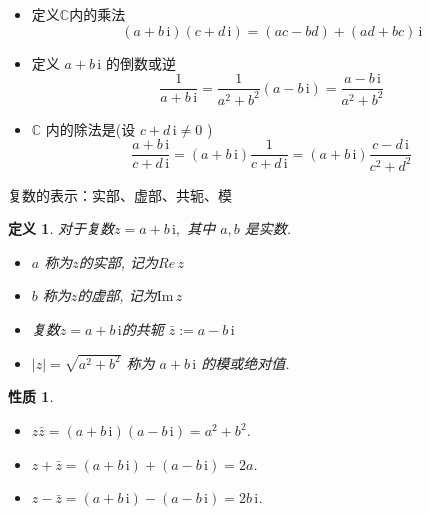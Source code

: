 \documentclass[11pt,punct]{ctexbeamer}
\newtheorem*{defi}{定义}
\newtheorem*{prop}{性质}
\def\i{\, \mathrm{i}}
\begin{document}
\begin{frame}
	\begin{itemize}
		\item 定义$\mathbb{C}$内的乘法
		\[
		(a+b \i)(c+d \i) =(a c-b d)+(a d+b c) \i
		\]

		\item 定义 $a+b {\i}$ 的倒数或逆
		\[
		\frac{1}{a+b \i}=\frac{1}{a^{2}+b^{2}}(a-b \i)=\frac{a-b \i}{a^{2}+b^{2}}
		\]
		\item  $\mathbb{C}$ 内的除法是(设 $c+d {\i} \neq 0$ )
		\[
		\frac{a+b \i}{c+d \i}=(a+b \i) \frac{1}{c+d \i}=(a+b \i) \frac{c-d \i}{c^{2}+d^{2}}
		\]
	\end{itemize}
\end{frame}

\begin{frame}{复数的表示：实部、虚部、共轭、模}

	\begin{defi}
		对于复数$z=a+b \i,$ 其中 $a, b$ 是实数.

		\begin{itemize}
			\item $a$ 称为$z$的\alert{实部}, 记为${Re}\,  z$

			\item $b$ 称为$z$的\alert{虚部}, 记为$\text{Im}\,  z$

			\item 复数$z=a+b \i$的\alert{共轭} $\bar{z}:=a-b\i$
			\item  $|z|=\sqrt{a^{2}+b^{2}}$ 称为 $a+b \i$ 的\alert{模}或绝对值.
		\end{itemize}
	\end{defi}
	\begin{prop}
		\begin{itemize}
			\item $z  \bar{z}=(a+b \i)(a-b \i)=a^{2}+b^{2}$.
			\item $z+\bar{z}=(a+b \i)+(a-b \i)=2 a$.
			\item $z-\bar{z}=(a+b \i)-(a-b \i)=2 b \i$.
		\end{itemize}
	\end{prop}
\end{frame}
\end{document}
